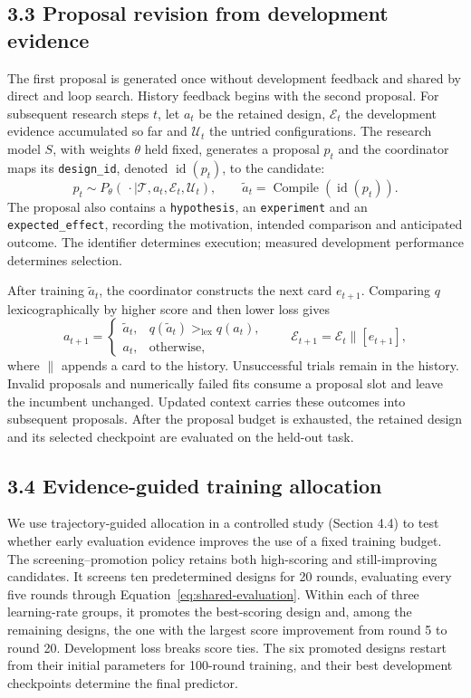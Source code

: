 \subsection*{3.3 Proposal revision from development evidence}
The first proposal is generated once without development feedback and shared by direct and loop search. History feedback begins with the second proposal. For subsequent research steps $t$, let $a_t$ be the retained design, $\mathcal E_t$ the development evidence accumulated so far and $\mathcal U_t$ the untried configurations. The research model $S$, with weights $\theta$ held fixed, generates a proposal $p_t$ and the coordinator maps its \texttt{design\_id}, denoted $\operatorname{id}(p_t)$, to the candidate:
\begin{equation}
p_t\sim P_\theta(\,\cdot\mid\mathcal T,a_t,\mathcal E_t,\mathcal U_t),
\qquad
\widetilde a_t=\operatorname{Compile}(\operatorname{id}(p_t)).
\label{eq:proposal}
\end{equation}
The proposal also contains a \texttt{hypothesis}, an \texttt{experiment} and an \texttt{expected\_effect}, recording the motivation, intended comparison and anticipated outcome. The identifier determines execution; measured development performance determines selection.

After training $\widetilde a_t$, the coordinator constructs the next card $e_{t+1}$. Comparing $q$ lexicographically by higher score and then lower loss gives
\begin{equation}
a_{t+1}=\begin{cases}
\widetilde a_t,&q(\widetilde a_t)>_{\mathrm{lex}}q(a_t),\\
a_t,&\text{otherwise},
\end{cases}
\qquad \mathcal E_{t+1}=\mathcal E_t\mathbin{\|}[e_{t+1}],
\label{eq:research-update}
\end{equation}
where $\|$ appends a card to the history. Unsuccessful trials remain in the history. Invalid proposals and numerically failed fits consume a proposal slot and leave the incumbent unchanged. Updated context carries these outcomes into subsequent proposals. After the proposal budget is exhausted, the retained design and its selected checkpoint are evaluated on the held-out task.

\subsection*{3.4 Evidence-guided training allocation}
We use trajectory-guided allocation in a controlled study (Section 4.4) to test whether early evaluation evidence improves the use of a fixed training budget. The screening--promotion policy retains both high-scoring and still-improving candidates. It screens ten predetermined designs for 20 rounds, evaluating every five rounds through Equation~\ref{eq:shared-evaluation}. Within each of three learning-rate groups, it promotes the best-scoring design and, among the remaining designs, the one with the largest score improvement from round 5 to round 20. Development loss breaks score ties. The six promoted designs restart from their initial parameters for 100-round training, and their best development checkpoints determine the final predictor.

